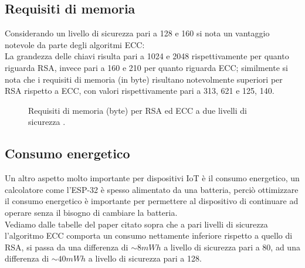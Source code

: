 \documentclass[12pt, a4paper]{report}
\begin{document}
\subsection{Requisiti di memoria}
Considerando un livello di sicurezza pari a 128 e 160 si nota un vantaggio notevole da parte degli algoritmi ECC:
\\La grandezza delle chiavi risulta pari a 1024 e 2048 rispettivamente per quanto riguarda RSA, invece pari a 160 e 210 
per quanto riguarda ECC; similmente si nota che i requisiti di memoria (in byte) risultano notevolmente superiori per RSA rispetto a ECC, con valori rispettivamente pari a 313, 621 e 125, 140.
\begin{figure}[H]
\centering
{}
\caption{Requisiti di memoria (byte) per RSA ed ECC a due livelli di sicurezza \cite{Vahdati}.}
\end{figure}

\subsection{Consumo energetico}
Un altro aspetto molto importante per dispositivi IoT è il consumo energetico, un calcolatore come l'ESP-32 è spesso alimentato da una batteria,
perciò ottimizzare il consumo energetico è importante per permettere al dispositivo di continuare ad operare senza 
il bisogno di cambiare la batteria.
\\Vediamo dalle tabelle del paper citato sopra che a pari livelli di sicurezza
l'algoritmo ECC comporta un consumo nettamente inferiore rispetto a quello di RSA, si passa da una differenza di $\sim 8mWh$ a livello di sicurezza pari a 80,
ad una differenza di $\sim 40mWh$ a livello di sicurezza pari a 128.
\end{document}
